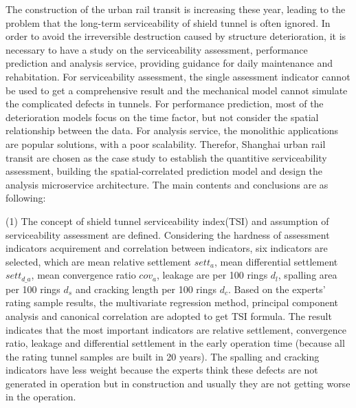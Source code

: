 \begin{eabstract}

The construction of the urban rail transit is increasing these year, leading to the problem that the long-term serviceability of shield tunnel is often ignored. In order to avoid the irreversible destruction caused by structure deterioration, it is necessary to have a study on the serviceability assessment, performance prediction and analysis service, providing guidance for daily maintenance and rehabitation. For serviceability assessment, the single assessment indicator cannot be used to get a comprehensive result and the mechanical model cannot simulate the complicated defects in tunnels. For performance prediction, most of the deterioration models focus on the time factor, but not consider the spatial relationship between the data. For analysis service, the monolithic applications are popular solutions, with a poor scalability. Therefor, Shanghai urban rail transit are chosen as the case study to establish the quantitive serviceability assessment, building the spatial-correlated prediction model and design the analysis microservice architecture. The main contents and conclusions are as following:

(1) The concept of shield tunnel serviceability index(TSI) and assumption of serviceability assessment are defined. Considering the hardness of assessment indicators acquirement and correlation between indicators, six indicators are selected, which are mean relative settlement $sett_{a}$, mean differential settlement $sett_{d\_a}$, mean convergence ratio $cov_a$, leakage are per 100 rings $d_l$, spalling area per 100 rings $d_s$ and cracking length per 100 rings $d_c$. Based on the experts' rating sample results, the multivariate regression method, principal component analysis and canonical correlation are adopted to get TSI formula. The result indicates that the most important indicators are relative settlement, convergence ratio, leakage and differential settlement in the early operation time (because all the rating tunnel samples are built in 20 years). The spalling and cracking indicators have less weight because the experts think these defects are not generated in operation but in construction and usually they are not getting worse in the operation. 


\end{eabstract}
